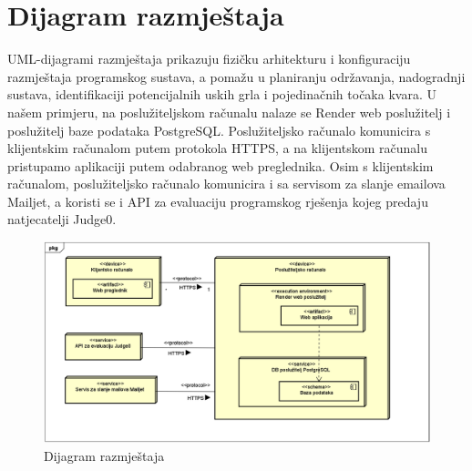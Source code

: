 
\eject



\section{Dijagram razmještaja}

UML-dijagrami razmještaja prikazuju fizičku arhitekturu i konfiguraciju razmještaja programskog sustava, a pomažu u planiranju održavanja, nadogradnji sustava, identifikaciji potencijalnih uskih grla i pojedinačnih točaka kvara. U našem primjeru, na poslužiteljskom računalu nalaze se Render web poslužitelj i poslužitelj baze podataka PostgreSQL. Poslužiteljsko računalo komunicira s klijentskim računalom putem protokola HTTPS, a na klijentskom računalu pristupamo aplikaciji putem odabranog web preglednika. Osim s klijentskim računalom, poslužiteljsko računalo komunicira i sa servisom za slanje emailova Mailjet, a koristi se i API za evaluaciju programskog rješenja kojeg predaju natjecatelji Judge0.

\begin{figure}[H]
	\includegraphics[scale=0.70]{dijagrami/dijagram_razmjestaja}
	\centering
	\caption{Dijagram razmještaja}
\end{figure}

